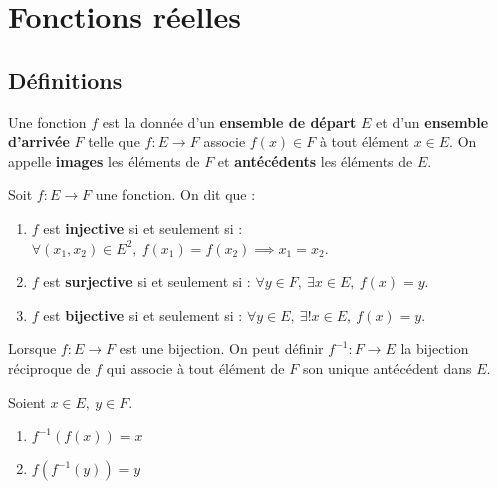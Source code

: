 \chapter{Fonctions réelles}

\section{Définitions}
\begin{definition}[Fonction]
	Une fonction $f$ est la donnée d'un \textbf{ensemble de départ} $E$ et d'un \textbf{ensemble d'arrivée} $F$ telle que 
	$ f : E \to F $
	associe $f(x) \in F$ à tout élément $x \in E$.
	On appelle \textbf{images} les éléments de $F$ et \textbf{antécédents} les éléments de $E$.
\end{definition}

\begin{definition}
	Soit $f : E \to F$ une fonction. On dit que :
    \begin{enumerate}
        \item $f$ est \textbf{injective} si et seulement si : $\forall (x_1, x_2) \in E^2,\ f(x_1) = f(x_2) \implies x_1 = x_2$.
        \item $f$ est \textbf{surjective} si et seulement si : $\forall y \in F,\ \exists x \in E,\ f(x) = y$.
        \item $f$ est \textbf{bijective} si et seulement si : $\forall y \in E,\ \exists ! x \in E,\ f(x) = y$.
    \end{enumerate}
\end{definition}

\begin{definition}
	Lorsque $f : E \to F$ est une bijection. On peut définir $f^{-1} : F \to E$ la bijection réciproque de $f$ qui associe à tout élément de $F$ son unique antécédent dans $E$.
\end{definition}

\begin{proposition}
	Soient $x \in E,\ y \in F$.
    \begin{multicols}{2}
        \begin{enumerate}
            \item $f^{-1} (f(x)) = x$
            \item $f(f^{-1}(y)) = y$
        \end{enumerate}
    \end{multicols}
\end{proposition}

